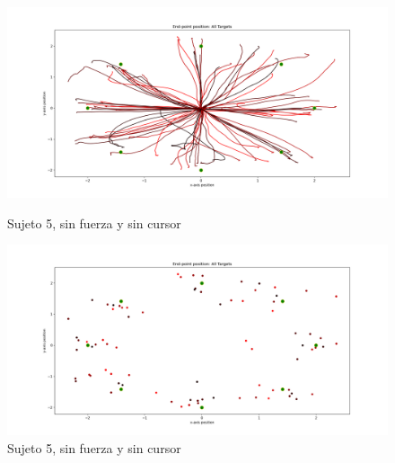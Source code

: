 \documentclass[a4paper,11pt, oneside]{book}
\begin{document}
\begin{figure}[H]
	\begin{minipage}[b]{0.5\linewidth}
		\centering
		\includegraphics[width=\linewidth]{sujeto5/no_force_no_cursor/trayectorias}
		\caption{Sujeto 5, sin fuerza y sin cursor}
		\label{5-fase3-1}
	\end{minipage}
	\hspace{0.5cm}
	\begin{minipage}[b]{0.5\linewidth}
		\centering
		\includegraphics[width=\linewidth]{sujeto5/no_force_no_cursor/trayectorias_puntos}
		\caption{Sujeto 5, sin fuerza y sin cursor}
		\label{5-fase3-2}
	\end{minipage}
\end{figure}
\end{document}

